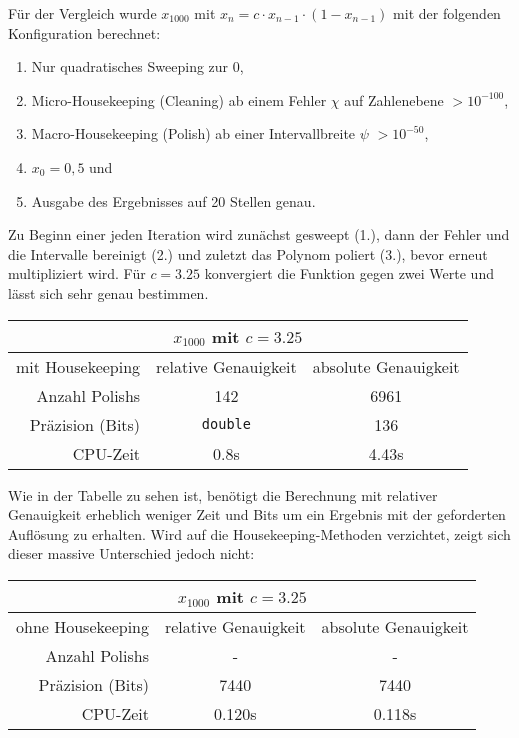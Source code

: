 Für der Vergleich wurde $x_{1000}$ mit $x_n = c \cdot x_{n-1} \cdot (1 - x_{n-1})$ mit der folgenden Konfiguration berechnet:
\begin{enumerate}
 \item Nur quadratisches Sweeping zur 0,
 \item Micro-Housekeeping (Cleaning) ab einem Fehler $\chi$ auf Zahlenebene $>10^{-100}$,
 \item Macro-Housekeeping (Polish) ab einer Intervallbreite $\psi$ $>10^{-50}$,
 \item $x_0 = 0,5$ und
 \item Ausgabe des Ergebnisses auf 20 Stellen genau.
\end{enumerate}
Zu Beginn einer jeden Iteration wird zunächst gesweept (1.), dann der Fehler und die Intervalle bereinigt (2.) und zuletzt das Polynom poliert (3.), bevor erneut multipliziert wird. Für $c = 3.25$ konvergiert die Funktion gegen zwei Werte und lässt sich sehr genau bestimmen.

\begin{center}
\begin{tabular}{|r|c|c|}
\hline
\multicolumn{3}{|c|}{$x_{1000}$ mit $c=3.25$}\\
\hline
 mit Housekeeping&relative Genauigkeit & absolute Genauigkeit \\
 \hline
 \hline
 Anzahl Polishs & 142 & 6961 \\
 Präzision (Bits) & \verb+double+ & 136 \\
 CPU-Zeit & 0.8s & 4.43s\\
 \hline
\end{tabular}
\end{center}

Wie in der Tabelle zu sehen ist, benötigt die Berechnung mit relativer Genauigkeit erheblich weniger Zeit und Bits um ein Ergebnis mit der geforderten Auflösung zu erhalten. Wird auf die Housekeeping-Methoden verzichtet, zeigt sich dieser massive Unterschied jedoch nicht:

\begin{center}
\begin{tabular}{|r|c|c|}
\hline
\multicolumn{3}{|c|}{$x_{1000}$ mit $c=3.25$}\\
\hline
 ohne Housekeeping &relative Genauigkeit & absolute Genauigkeit \\
 \hline
 \hline
 Anzahl Polishs & -& -\\
 Präzision (Bits) & 7440 & 7440 \\
 CPU-Zeit & 0.120s & 0.118s\\
 \hline
\end{tabular}
\end{center}

